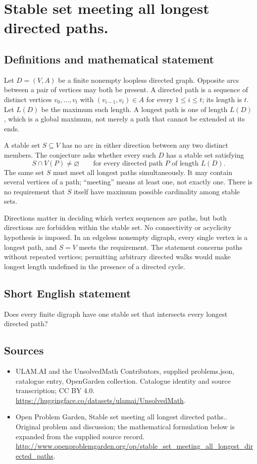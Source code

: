 \documentclass[11pt,a4paper]{article}
\begin{document}
\section*{Stable set meeting all longest directed paths.}\label{statement}

\subsection{Definitions and mathematical statement}
Let $D=(V,A)$ be a finite nonempty loopless directed graph. Opposite
arcs between a pair of vertices may both be present. A directed path
is a sequence of distinct vertices $v_0,\ldots,v_t$ with
$(v_{i-1},v_i)\in A$ for every $1\le i\le t$; its length is $t$.
Let $L(D)$ be the maximum such length. A longest path is one of length
$L(D)$, which is a global maximum, not merely a path that cannot be
extended at its ends.

A stable set $S\subseteq V$ has no arc in either direction between
any two distinct members. The conjecture asks whether every such
$D$ has a stable set satisfying
\[
 S\cap V(P)\ne\varnothing
          \qquad\text{for every directed path }P\text{ of length }L(D).
\]
The same set $S$ must meet all longest paths simultaneously. It may
contain several vertices of a path; ``meeting'' means at least one,
not exactly one. There is no requirement that $S$ itself have maximum
possible cardinality among stable sets.

Directions matter in deciding which vertex sequences are paths, but
both directions are forbidden within the stable set. No connectivity
or acyclicity hypothesis is imposed. In an edgeless nonempty digraph,
every single vertex is a longest path, and $S=V$ meets the requirement.
The statement concerns paths without repeated vertices; permitting
arbitrary directed walks would make longest length undefined in the
presence of a directed cycle.
\subsection{Short English statement}
Does every finite digraph have one stable set that intersects every longest directed path?
\subsection{Sources}
\begin{itemize}
\item[S1] ULAM.AI and the UnsolvedMath Contributors, supplied problems.json, catalogue entry, OpenGarden collection. Catalogue identity and source transcription; CC BY 4.0.
\url{https://huggingface.co/datasets/ulamai/UnsolvedMath}.
\item[S2] Open Problem Garden, Stable set meeting all longest directed paths.. Original problem and discussion; the mathematical formulation below is expanded from the supplied source record.
\url{http://www.openproblemgarden.org/op/stable_set_meeting_all_longest_directed_paths}.
\end{itemize}
\end{document}
